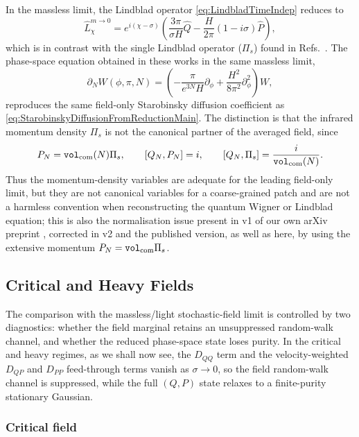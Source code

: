 \documentclass{article}
\newcommand{\VF}{\mathtt{vol}_{\rm com}}
\numberwithin{equation}{section}
\begin{document}
In the massless limit, the Lindblad operator \cref{eq:LindbladTimeIndep} reduces to
%
\begin{equation}
	\hat{L}_\chi^{m\to 0} = e^{i(\chi-\sigma)}\!\left(\frac{3\pi}{\sigma H}\hat{Q} - \frac{H}{2\pi}(1-i\sigma)\hat{P}\right) ,
	\label{eq:LMasslessLimit}
\end{equation}
%
which is in contrast with the single Lindblad operator ($\Pi_s$) found in Refs.~\cite{Li2026Stochastic,Li2026lwl}. The phase-space equation obtained in these works in the same massless limit,
	\begin{equation}
		\partial_N W(\phi,\pi,N) = \left( - \frac{\pi}{e^{3 N}H}\partial_\phi + \frac{H^2}{8\pi^2}\partial_\phi^2 \right)W ,
	\end{equation}
	reproduces the same field-only Starobinsky diffusion coefficient as \cref{eq:StarobinskyDiffusionFromReductionMain}. The distinction is that the infrared momentum density \(\Pi_s\) is not the canonical partner of the averaged field, since
	\begin{equation}
		P_N=\VF(N)\Pi_s, \qquad [Q_N,P_N]=i, \qquad [Q_N,\Pi_s]=\frac{i}{\VF(N)} .
	\end{equation}
	Thus the momentum-density variables are adequate for the leading field-only limit, but they are not canonical variables for a coarse-grained patch and are not a harmless convention when reconstructing the quantum Wigner or Lindblad equation; this is also the normalisation issue present in v1 of our own arXiv preprint \cite{Christie:2025knc}, corrected in v2 and the published version, as well as here, by using the extensive momentum \(P_N=\VF\Pi_s\).
	\subsection{Critical and Heavy Fields}
	\label{sec:massive_limits}

	The comparison with the massless/light stochastic-field limit is controlled by two diagnostics: whether the field marginal retains an unsuppressed random-walk channel, and whether the reduced phase-space state loses purity. In the critical and heavy regimes, as we shall now see, the \(D_{QQ}\) term and the velocity-weighted \(D_{QP}\) and \(D_{PP}\) feed-through terms vanish as \(\sigma\to0\), so the field random-walk channel is suppressed, while the full \((Q,P)\) state relaxes to a finite-purity stationary Gaussian.

	\subsubsection{Critical field}
\end{document}
